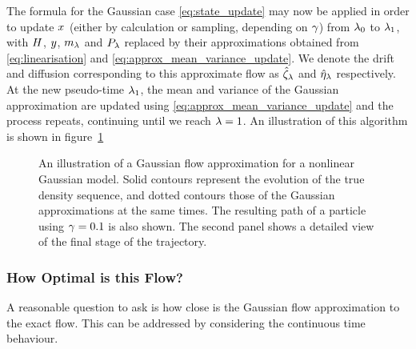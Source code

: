\documentclass{article}
\begin{document}
The formula for the Gaussian case \eqref{eq:state_update} may now be applied in order to update $x_{}$ (either by calculation or sampling, depending on $\gamma$) from $\lambda_0$ to $\lambda_1$, with $H$, $y_{}$, $m_{\lambda}$ and $P_{\lambda}$ replaced by their approximations obtained from \eqref{eq:linearisation} and \eqref{eq:approx_mean_variance_update}. We denote the drift and diffusion corresponding to this approximate flow as $\hat{\zeta}_{\lambda}$ and $\hat{\eta}_{\lambda}$ respectively. At the new pseudo-time $\lambda_1$, the mean and variance of the Gaussian approximation are updated using \eqref{eq:approx_mean_variance_update} and the process repeats, continuing until we reach $\lambda=1$. An illustration of this algorithm is shown in figure~\ref{approx_gaussian_flow_example}

\begin{figure}[bt]
\centering
\subfloat[]{  }
\subfloat[]{  }
\caption{An illustration of a Gaussian flow approximation for a nonlinear Gaussian model. Solid contours represent the evolution of the true density sequence, and dotted contours those of the Gaussian approximations at the same times. The resulting path of a particle using $\gamma=0.1$ is also shown. The second panel shows a detailed view of the final stage of the trajectory.}
\label{approx_gaussian_flow_example}
\end{figure}



\subsubsection{How Optimal is this Flow?}

A reasonable question to ask is how close is the Gaussian flow approximation to the exact flow. This can be addressed by considering the continuous time behaviour.
\end{document}
